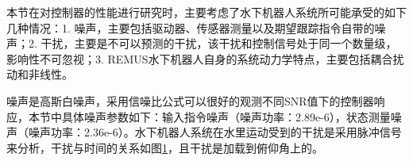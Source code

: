 本节在对控制器的性能进行研究时，主要考虑了水下机器人系统所可能承受的如下几种情况：1. 噪声，主要包括驱动器、传感器测量以及期望跟踪指令自带的噪声；2. 干扰，主要是不可以预测的干扰，该干扰和控制信号处于同一个数量级，影响性不可忽视；3. REMUS水下机器人自身的系统动力学特点，主要包括耦合扰动和非线性。

噪声是高斯白噪声，采用信噪比公式可以很好的观测不同SNR值下的控制器响应，本节中具体噪声参数如下：输入指令噪声（噪声功率：2.89e-6），状态测量噪声（噪声功率：2.36e-6）。水下机器人系统在水里运动受到的干扰是采用脉冲信号来分析，干扰与时间的关系如图\ref{fig:chap5:F4}，且干扰是加载到俯仰角上的。

\begin{figure}[!htp]
\label{fig:chap5:F4}
\centering
{}
\end{figure}


